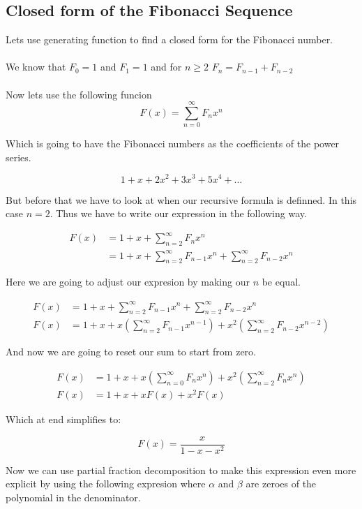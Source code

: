 \subsection{Closed form of the Fibonacci Sequence}

Lets use generating function to find a closed form for the Fibonacci number. 
\\\\
We know that \(F_0 = 1\) and \(F_1 = 1\) and for \(n \ge 2\) \(F_n = F_{n-1} + F_{n-2}\)
\\\\
Now lets use the following funcion
\[
    F(x) = \sum_{n = 0}^{\infty} F_n x^{n}
\]

Which is going to have the Fibonacci numbers as the coefficients of the power series.

\[
    1 + x + 2x^2 + 3x^3 + 5x^4 + \dots
\]

But before that we have to look at when our recursive formula is definned.
In this case \(n = 2\). Thus we have to write our expression in the following way.

\begin{align*}
F(x) &= 1 + x + \sum_{n = 2}^{\infty} F_n x^{n}\\
&= 1 + x + \sum_{n = 2}^{\infty} F_{n -1} x^{n} + \sum_{n = 2}^{\infty} F_{n - 2}x^n 
\end{align*}

Here we are going to adjust our expresion by making our \(n\) be equal.

\begin{align*}
F(x) &= 1 + x + \sum_{n = 2}^{\infty} F_{n -1} x^{n} + \sum_{n = 2}^{\infty} F_{n - 2}x^n \\ 
F(x) &= 1 + x + x \left( \sum_{n = 2}^{\infty} F_{n -1} x^{n-1}\right) + x^2 \left( \sum_{n = 2}^{\infty} F_{n -2} x^{n-2}\right)
\end{align*}

And now we are going to reset our sum to start from zero.

\begin{align*}
F(x) &= 1 + x + x \left( \sum_{n = 0}^{\infty} F_{n} x^{n}\right) + x^2 \left( \sum_{n = 2}^{\infty} F_{n} x^{n}\right)\\
F(x) &= 1 + x + x F(x) + x^2 F(x)
\end{align*}

Which at end simplifies to:

\[
F(x) = \frac{x}{1 - x - x^2}
\]

Now we can use partial fraction decomposition to make this expression even more explicit
by using the following expresion where \(\alpha\) and \(\beta\) are zeroes of the polynomial in the
denominator.

